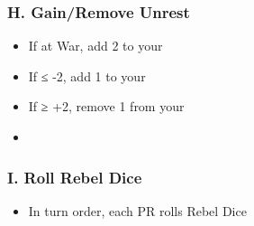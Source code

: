 \documentclass[10pt]{article}
\begin{document}
\subsubsection*{H. Gain/Remove Unrest}
\begin{itemize}
	\item If at War, add 2 \unrest to your \towns
	\item If ≤ -2\stability, add 1 \unrest to your \towns
	\item If ≥ +2\stability, remove 1 \unrest from your \towns
	\item {}
\end{itemize}

\subsubsection*{I. Roll Rebel Dice}
\begin{itemize}
	\item In turn order, each PR rolls Rebel Dice
\end{itemize}
\end{document}
